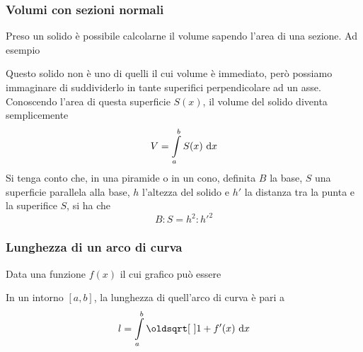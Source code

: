 \subsubsection{Volumi con sezioni normali}
Preso un solido è possibile calcolarne il volume sapendo l'area di una sezione. Ad esempio
\begin{center}
\end{center}
Questo solido non è uno di quelli il cui volume è immediato, però possiamo immaginare di 
suddividerlo in tante superifici perpendicolare ad un asse. Conoscendo l'area di questa
superficie $S(x)$, il volume del solido diventa semplicemente
\begin{equation*}
  V = \int\limits_{a}^{b} S(x)\,\mathop{}\!\mathrm{d} x
\end{equation*}
Si tenga conto che, in una piramide o in un cono, definita $B$ la base, $S$ una superficie 
parallela alla base, $h$ l'altezza del solido e $h'$ la distanza tra la punta e la superifice $S$,
si ha che
\begin{equation*}
  B:S=h^2:h'^2
\end{equation*}

\subsubsection{Lunghezza di un arco di curva}
Data una funzione $f(x)$ il cui grafico può essere
\begin{center}
\end{center}
In un intorno ${[a,b]}$, la lunghezza di quell'arco di curva è pari a
\begin{equation*}
  l = \int\limits_{a}^{b} \sqrt{1+f'(x)}\,\dif x
\end{equation*}
